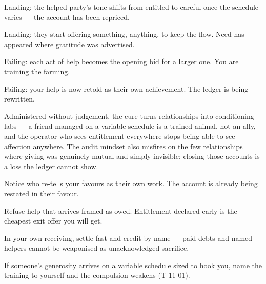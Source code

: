 \begin{feedback}
  \item Landing: the helped party's tone shifts from entitled to careful once the schedule varies --- the account has been repriced.
  \item Landing: they start offering something, anything, to keep the flow. Need has appeared where gratitude was advertised.
  \item Failing: each act of help becomes the opening bid for a larger one. You are training the farming.
  \item Failing: your help is now retold as their own achievement. The ledger is being rewritten.
\end{feedback}
\begin{failure}
Administered without judgement, the cure turns relationships into conditioning labs --- a friend managed on a variable schedule is a trained animal, not an ally, and the operator who sees entitlement everywhere stops being able to see affection anywhere. The audit mindset also misfires on the few relationships where giving was genuinely mutual and simply invisible; closing those accounts is a loss the ledger cannot show.
\end{failure}
\begin{countermeasures}
  \item Notice who re-tells your favours as their own work. The account is already being restated in their favour.
  \item Refuse help that arrives framed as owed. Entitlement declared early is the cheapest exit offer you will get.
  \item In your own receiving, settle fast and credit by name --- paid debts and named helpers cannot be weaponised as unacknowledged sacrifice.
  \item If someone's generosity arrives on a variable schedule sized to hook you, name the training to yourself and the compulsion weakens (T-11-01).
\end{countermeasures}

\seesources
{}
